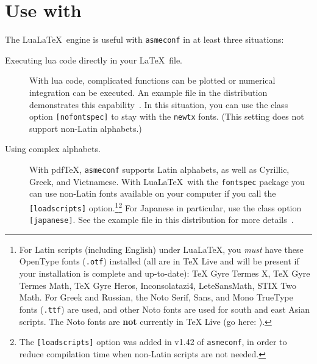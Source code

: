 \documentclass[colorlinks,upint,subscriptcorrection,varvw,balance,loadscripts,german,vietamese]{asmeconf} %
\newcommand*\pdfTeX{pdf\TeX}
\newcommand*\LuaLaTeX{Lua\LaTeX}
\begin{document}
\section[Use with LuaLaTeX]{Use with  }\label{appendix:b}

The \LuaLaTeX\  engine is useful with \texttt{asmeconf} in at least three situations:

\begin{description}

\item[Executing lua code directly in your \LaTeX\ file.] With lua code, complicated functions can be plotted or numerical integration can be executed. An example file in the distribution demonstrates this capability~\cite{lienhard2025}. In this situation, you can use the class option \texttt{[nofontspec]} to stay with the \texttt{newtx} fonts. (This setting does not support non-Latin alphabets.)

\item[Using complex alphabets.] With \pdfTeX, \texttt{asmeconf} supports Latin alphabets, as well as Cyrillic, Greek, and Vietnamese. With \LuaLaTeX\  with the \texttt{fontspec} package you can use non-Latin fonts available on your computer if you call the \texttt{[loadscripts]} option.\footnote{For Latin scripts (including English) under \LuaLaTeX, you \emph{must} have these OpenType fonts (\texttt{.otf}) installed (all are in TeX Live and will be present if your installation is complete and up-to-date): TeX Gyre Termes X, TeX Gyre Termes Math, TeX Gyre Heros, Inconsolatazi4, LeteSansMath, STIX Two Math. For Greek and Russian, the Noto Serif, Sans, and Mono TrueType fonts (\texttt{.ttf}) are used, and other Noto fonts are used for south and east Asian scripts. The Noto fonts are \textbf{not} currently in TeX Live (go here: ).}\footnote{The \texttt{[loadscripts]} option was added in v1.42 of \texttt{asmeconf}, in order to reduce compilation time when non-Latin scripts are not needed.}   For Japanese in particular, use the class option \texttt{[japanese]}. See the example file in this distribution for more details~\cite{lienhard2021}.


\end{description}
\end{document}
